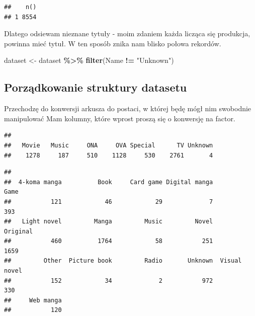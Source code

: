 \documentclass[
]{article}
\newenvironment{Shaded}{\begin{snugshade}}{\end{snugshade}}
\newcommand{\FunctionTok}[1]{\textcolor[rgb]{0.13,0.29,0.53}{\textbf{#1}}}
\newcommand{\NormalTok}[1]{#1}
\newcommand{\OtherTok}[1]{\textcolor[rgb]{0.56,0.35,0.01}{#1}}
\newcommand{\SpecialCharTok}[1]{\textcolor[rgb]{0.81,0.36,0.00}{\textbf{#1}}}
\newcommand{\StringTok}[1]{\textcolor[rgb]{0.31,0.60,0.02}{#1}}
\begin{document}
\begin{verbatim}
##    n()
## 1 8554
\end{verbatim}

Dlatego odsiewam nieznane tytuły - moim zdaniem każda licząca się
produkcja, powinna mieć tytuł. W ten sposób znika nam blisko połowa
rekordów.

\begin{Shaded}
\begin{Highlighting}[]
\NormalTok{dataset }\OtherTok{\textless{}{-}}\NormalTok{ dataset }\SpecialCharTok{\%\textgreater{}\%}
  \FunctionTok{filter}\NormalTok{(Name }\SpecialCharTok{!=} \StringTok{"Unknown"}\NormalTok{)}
\end{Highlighting}
\end{Shaded}

\subsection{Porządkowanie struktury
datasetu}\label{porzux105dkowanie-struktury-datasetu}

Przechodzę do konwersji arkusza do postaci, w której będę mógł nim
swobodnie manipulować Mam kolumny, które wprost proszą się o konwersję
na factor.

\begin{Shaded}
\end{Shaded}

\begin{verbatim}
## 
##   Movie   Music     ONA     OVA Special      TV Unknown 
##    1278     187     510    1128     530    2761       4
\end{verbatim}

\begin{Shaded}
\end{Shaded}

\begin{verbatim}
## 
##  4-koma manga          Book     Card game Digital manga          Game 
##           121            46            29             7           393 
##   Light novel         Manga         Music         Novel      Original 
##           460          1764            58           251          1659 
##         Other  Picture book         Radio       Unknown  Visual novel 
##           152            34             2           972           330 
##     Web manga 
##           120
\end{verbatim}
\end{document}
